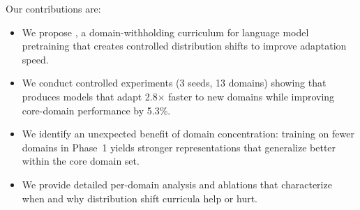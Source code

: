 Our contributions are:
\begin{itemize}[leftmargin=*,itemsep=0pt,topsep=0pt]
    \item We propose \dsc, a domain-withholding curriculum for language model pretraining that creates controlled distribution shifts to improve adaptation speed.
    \item We conduct controlled experiments (3 seeds, 13 domains) showing that \dsc produces models that adapt 2.8$\times$ faster to new domains while improving core-domain performance by 5.3\%.
    \item We identify an unexpected benefit of domain concentration: training on fewer domains in Phase~1 yields stronger representations that generalize better within the core domain set.
    \item We provide detailed per-domain analysis and ablations that characterize when and why distribution shift curricula help or hurt.
\end{itemize}
